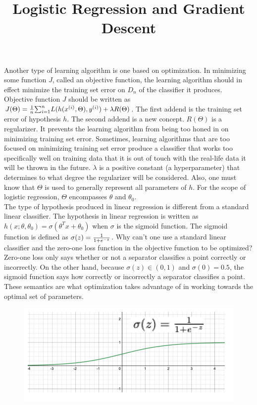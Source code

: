 \documentclass{article}
\title{Logistic Regression and Gradient Descent}
\author{ }
\date{ }
\begin{document}
	
	\maketitle 

    Another type of learning algorithm is one based on optimization. In minimizing some function $J$, called an objective function, the learning algorithm should in effect minimize the training set error on $D_n$ of the classifier it produces. \\

    Objective function $J$ should be written as $J(\Theta) = {1\over{n}}{\sum^n_{i=1}}{L(h(x^{(i)}, \Theta),y^{(i)})+\lambda{R(\Theta)}}$. The first addend is the training set error of hypothesis $h$. The second addend is a new concept. $R(\Theta)$ is a regularizer. It prevents the learning algorithm from being too honed in on minimizing training set error. Sometimes, learning algorithms that are too focused on minimizing training set error produce a classifier that works too specifically well on training data that it is out of touch with the real-life data it will be thrown in the future. $\lambda$ is a positive constant (a hyperparameter) that determines to what degree the regularizer will be considered. Also, one must know that $\Theta$ is used to generally represent all parameters of $h$. For the scope of logistic regression, $\Theta$ encompasses $\theta$ and $\theta_0$. \\

    The type of hypothesis produced in linear regression is different from a standard linear classifier. The hypothesis in linear regression is written as $h(x; \theta, \theta_0)=\sigma(\theta^Tx+\theta_0)$ when $\sigma$ is the sigmoid function. The sigmoid function is defined as $\sigma(z)={{1}\over{1+e^{-z}}}$. Why can't one use a standard linear classifier and the zero-one loss function in the objective function to be optimized? Zero-one loss only says whether or not a separator classifies a point correctly or incorrectly. On the other hand, because $\sigma(z)\in(0,1)$ and $\sigma(0)=0.5$, the sigmoid function says how correctly or incorrectly a separator classifies a point. These semantics are what optimization takes advantage of in working towards the optimal set of parameters.  
    
    \begin{figure}[H]
        \centering
        \includegraphics[width=0.5\linewidth]{Sigmoid Function.png}
    \end{figure}
\end{document}
